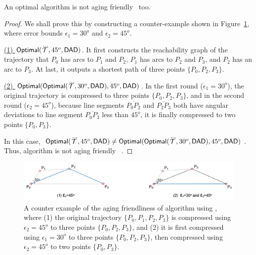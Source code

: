 \begin{proposition}
	\label{theo-aging-opt-dad}
	An optimal algorithm is not aging friendly \wrt~\dad too.
\end{proposition}

\begin{proof}
	We shall prove this by constructing a counter-example shown in Figure~\ref{fig:aging-opt-dad}, where error bounds $\epsilon_1 =30^o$ and $\epsilon_2=45^o$.
	
	\underline{(1) ${{\mathsf{Optimal}}}(\dddot{\mathcal{T}}, 45^o, {\mathsf{DAD}})$}.
	It first constructs the reachability graph of the trajectory that $P_0$ has arcs to $P_1$ and $P_2$, $P_1$ has arcs to $P_2$ and $P_3$, and $P_2$ has an arc to $P_3$. At last, it outputs a shortest path of three points $\{P_0, P_2, P_3\}$.
	
	\underline{(2) ${{\mathsf{Optimal}}}({\mathsf{Optimal}}(\dddot{\mathcal{T}}, 30^o, {\mathsf{DAD}}), 45^o, {\mathsf{DAD}})$}. In the first round ($\epsilon_1=30^o$), the original trajectory is compressed to three points $\{P_0, P_2, P_3\}$, and in the second round ($\epsilon_2=45^o$), because line segments  $\overline{P_0P_2}$ and $\overline{P_2P_3}$ both have angular deviations to line segment $\overline{P_0P_3}$ less than $45^o$, it is finally compressed to two points $\{P_0, P_3\}$.
	
	In this case, ${{\mathsf{Optimal}}}(\dddot{\mathcal{T}}, 45^o, {\mathsf{DAD}}) \ne {{\ensuremath {\mathsf{Optimal}}}}({\mathsf{Optimal}}(\dddot{\mathcal{T}}, 30^o, {\mathsf{DAD}}), 45^o, {\mathsf{DAD}})$. Thus, algorithm \opt is not aging friendly \wrt~\dad.
\end{proof}	
	
\begin{figure}
		\centering
		\includegraphics[scale=0.68]{Figures/Fig-aging-opt.jpg}
		
		\caption{\small A counter example of the aging friendliness of algorithm \opt using \dad, where (1) the original trajectory $\{P_0, P_1, P_2, P_3\}$ is compressed using $\epsilon_2=45^o$ to three points $\{P_0, P_2, P_3\}$, and (2) it is first compressed using $\epsilon_1=30^o$ to three points $\{P_0, P_2, P_3\}$, then compressed using $\epsilon_2=45^o$ to two points $\{P_0, P_3\}$. }
		\vspace{-1ex}
		\label{fig:aging-opt-dad}
\end{figure}

